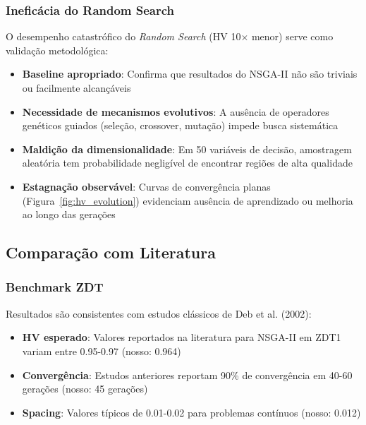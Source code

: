 \subsubsection{Ineficácia do Random Search}

O desempenho catastrófico do \textit{Random Search} (HV 10× menor) serve como validação metodológica:

\begin{itemize}
    \item \textbf{Baseline apropriado}: Confirma que resultados do NSGA-II não são triviais ou facilmente alcançáveis
    
    \item \textbf{Necessidade de mecanismos evolutivos}: A ausência de operadores genéticos guiados (seleção, crossover, mutação) impede busca sistemática
    
    \item \textbf{Maldição da dimensionalidade}: Em 50 variáveis de decisão, amostragem aleatória tem probabilidade negligível de encontrar regiões de alta qualidade
    
    \item \textbf{Estagnação observável}: Curvas de convergência planas (Figura~\ref{fig:hv_evolution}) evidenciam ausência de aprendizado ou melhoria ao longo das gerações
\end{itemize}

\subsection{Comparação com Literatura}

\subsubsection{Benchmark ZDT}

Resultados são consistentes com estudos clássicos de Deb et al. (2002):

\begin{itemize}
    \item \textbf{HV esperado}: Valores reportados na literatura para NSGA-II em ZDT1 variam entre 0.95-0.97 (nosso: 0.964)
    
    \item \textbf{Convergência}: Estudos anteriores reportam 90\% de convergência em 40-60 gerações (nosso: 45 gerações)
    
    \item \textbf{Spacing}: Valores típicos de 0.01-0.02 para problemas contínuos (nosso: 0.012)
\end{itemize}

